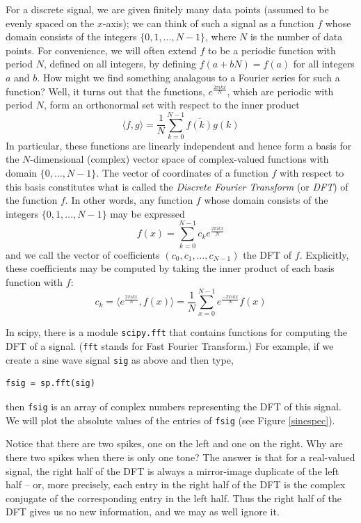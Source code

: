 For a discrete signal, we are given finitely many data points (assumed to be evenly spaced on the $x$-axis); we can think of such a signal as a function $f$ whose domain consists of the integers $\{0,1,\dots,N-1\}$, where $N$ is the number of data points. For convenience, we will often extend $f$ to be a periodic function with period $N$, defined on all integers, by defining $f(a+bN)=f(a)$ for all integers $a$ and $b$. How might we find something analagous to a Fourier series for such a function? Well, it turns out that the functions, $e^{\frac{2\pi ikx}N}$, which are periodic with period $N$, form an orthonormal set with respect to the inner product
$$\langle f,g\rangle = \frac1N\sum_{k=0}^{N-1}\overline{f(k)}g(k)$$
In particular, these functions are linearly independent and hence form a basis for the $N$-dimensional (complex) vector space of complex-valued functions with domain $\{0,\dots,N-1\}$. The vector of coordinates of a function $f$ with respect to this basis constitutes what is called the \emph{Discrete Fourier Transform} (or \emph{DFT}) of the function $f$. In other words, any function $f$ whose domain consists of the integers $\{0,1,\dots,N-1\}$ may be expressed
$$f(x)=\sum_{k=0}^{N-1}c_ke^{\frac{2\pi ikx}N}$$
and we call the vector of coefficients $(c_0,c_1,\dots,c_{N-1})$ the DFT of $f$. Explicitly, these coefficients may be computed by taking the inner product of each basis function with $f$:
$$c_k=\langle e^{\frac{2\pi ikx}N}, f(x)\rangle=\frac1N\sum_{x=0}^{N-1}e^{\frac{-2\pi ikx}N}f(x)$$

In scipy, there is a module \texttt{scipy.fft} that contains functions for computing the DFT of a signal. (\texttt{fft} stands for Fast Fourier Transform.) For example, if we create a sine wave signal \texttt{sig} as above and then type,
\begin{lstlisting}
fsig = sp.fft(sig)
\end{lstlisting}
then \texttt{fsig} is an array of complex numbers representing the DFT of this signal. We will plot the absolute values of the entries of \texttt{fsig} (see Figure \ref{sinespec}).

Notice that there are two spikes, one on the left and one on the right. Why are there two spikes when there is only one tone? The answer is that for a real-valued signal, the right half of the DFT is always a mirror-image duplicate of the left half -- or, more precisely, each entry in the right half of the DFT is the complex conjugate of the corresponding entry in the left half. Thus the right half of the DFT gives us no new information, and we may as well ignore it.

